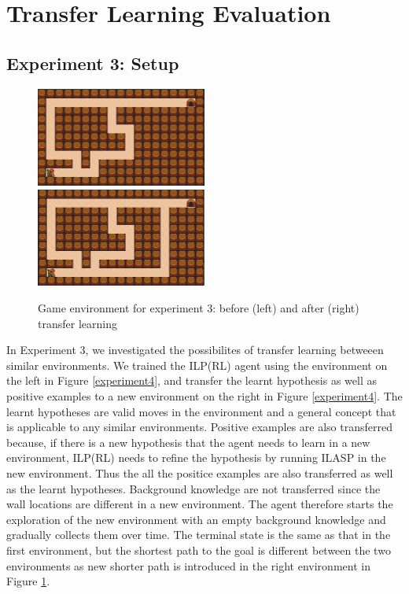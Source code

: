 \clearpage
\newpage
\section{Transfer Learning Evaluation}
\label{sec:transfer_learning_evaluation}

\subsection{Experiment 3: Setup}
\label{subsec:experiement3_setup}

\begin{figure}[!htb]
\centerline{
\includegraphics[width=0.5\textwidth]{./figures/experiment3_before}
\includegraphics[width=0.5\textwidth]{./figures/experiment3_after}
}
\caption{Game environment for experiment 3: before (left) and after (right) transfer learning}
\label{experiment3_setup}
\end{figure}

In Experiment 3, we investigated the possibilites of transfer learning betweeen similar environments.
We trained the ILP(RL) agent using the environment on the left in Figure \ref{experiment4}, 
and transfer the learnt hypothesis as well as positive examples to a new environment on the right in Figure \ref{experiment4}.
The learnt hypotheses are valid moves in the environment and a general concept that is applicable to any similar environments. 
Positive examples are also transferred because, if there is a new hypothesis that the agent needs to learn in a new environment, 
ILP(RL) needs to refine the hypothesis by running ILASP in the new environment.
Thus the all the positice examples are also transferred as well as the learnt hypotheses. 
Background knowledge are not transferred since the wall locations are different in a new environment.
The agent therefore starts the exploration of the new environment with an empty background knowledge and gradually collects them over time.
The terminal state is the same as that in the first environment, but the shortest path to the goal is different between the two environments as new shorter path is introduced in the right environment in Figure \ref{experiment3_setup}.

